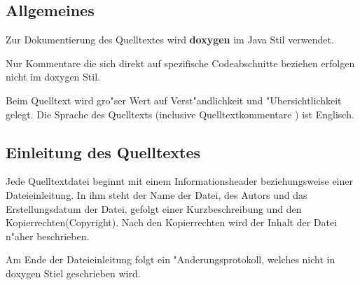 %
%
%
%

\subsection{Allgemeines}

Zur Dokumentierung des Quelltextes wird \textbf{doxygen} im Java Stil verwendet.

Nur Kommentare die sich direkt auf spezifische Codeabschnitte beziehen erfolgen nicht im doxygen Stil.

Beim Quelltext wird gro"ser Wert auf Verst"andlichkeit und "Ubersichtlichkeit gelegt.
Die Sprache des Quelltexts (inclusive Quelltextkommentare ) ist Englisch.


\subsection{Einleitung des Quelltextes}

Jede Quelltextdatei beginnt mit einem Informationsheader beziehungsweise einer Dateieinleitung. In ihm steht der Name der Datei, des Autors und das Erstellungsdatum der Datei, gefolgt einer Kurzbeschreibung und den Kopierrechten(Copyright). Nach den Kopierrechten wird der Inhalt der Datei n"aher beschrieben.

Am Ende der Dateieinleitung folgt ein "Anderungsprotokoll, welches nicht in doxygen Stiel geschrieben wird.

